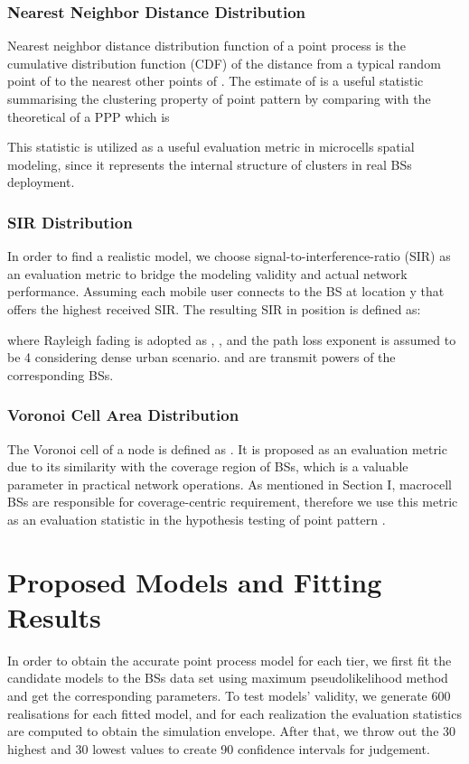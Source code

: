 \documentclass[conference]{IEEEtran}
\begin{document}
\subsubsection{\bf{Nearest Neighbor Distance Distribution}}
Nearest neighbor distance distribution function of a point process  is the cumulative distribution function (CDF)  of the distance from a typical random point of  to the nearest other points of \cite{ripley1991statistical}. The estimate of  is a useful statistic summarising the clustering property of point pattern by comparing with the theoretical  of a PPP which is

This statistic is utilized as a useful evaluation metric in microcells spatial modeling, since it represents the internal structure of clusters in real BSs deployment.

\subsubsection{\bf{SIR Distribution}}
In order to find a realistic model, we choose signal-to-interference-ratio (SIR) as an evaluation metric to bridge the modeling validity and actual network performance. Assuming each mobile user connects to the BS at location y that offers the highest received SIR. The resulting SIR in position  is defined as:

where Rayleigh fading is adopted as , , and the path loss exponent  is assumed to be 4 considering dense urban scenario.  and  are transmit powers of the corresponding BSs.

\subsubsection{\bf{Voronoi Cell Area Distribution}}
The Voronoi cell of a node  is defined as . It is proposed as an evaluation metric due to its similarity with the coverage region of BSs\cite{taylor2012pairwise}, which is a valuable parameter in practical network operations. As mentioned in Section I, macrocell BSs are responsible for coverage-centric requirement, therefore we use this metric as an evaluation statistic in the hypothesis testing of point pattern .

\section{Proposed Models and Fitting Results}
In order to obtain the accurate point process model for each tier, we first fit the candidate models to the BSs data set using maximum pseudolikelihood method and get the corresponding parameters. To test models' validity, we generate 600 realisations for each fitted model, and for each realization the evaluation statistics are computed to obtain the simulation envelope. After that, we throw out the 30 highest and 30 lowest values to create 90 confidence intervals for judgement.
\end{document}
